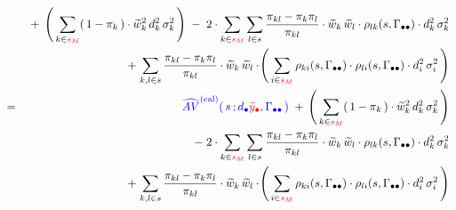 \begin{lemma}
\begin{enumerate}
\begin{eqnarray*}
    &&
        \; + \;
        \left(\,
            \underset{k\in {\color{red}s_{M}}}{\sum}\!
            \left(\,1-\pi_{k}\,\right)
            \cdot
            \widetilde{w}_{k}^{2}\,d_{k}^{2}\,\sigma_{k}^{2}
            \,\right)
        \; - \; 2 \cdot
        \underset{k \in {\color{red}s_{M}}}{\sum}\,
        \underset{l \in {\color{black}s}}{\sum}\,
        \dfrac{\pi_{kl} - \pi_{k}\pi_{l}}{\pi_{kl}}
        \cdot
        \widetilde{w}_{k}\,\widetilde{w}_{l}
        \cdot
        \rho_{lk}(s,\Gamma_{\bullet\bullet})
        \cdot
        d_{k}^{2}\,
        \sigma_{k}^{2}
    \\
    &&
        \; + \;
        \underset{k,l \in s}{\sum}\,
        \dfrac{\pi_{kl} - \pi_{k}\pi_{l}}{\pi_{kl}}
        \cdot
        \widetilde{w}_{k}\,\widetilde{w}_{l}
        \cdot\!
        \left(\,
            \underset{i \in {\color{red}s_{M}} }{\sum}\,
            \rho_{ki}(s,\Gamma_{\bullet\bullet})
            \cdot
            \rho_{li}(s,\Gamma_{\bullet\bullet})
            \cdot
            d_{i}^{2}\,\sigma_{i}^{2}
            \,\right)
    \\
    & = &
        {\color{blue}
        \widehat{AV}^{\textnormal{(cal)}}(\,s\,;d_{\bullet}{\color{red}\widetilde{y}_{\bullet}},\Gamma_{\bullet\bullet}\,)
        }
        \; + \,
        \left(\,
            \underset{k\in {\color{red}s_{M}}}{\sum}\!
            \left(\,1-\pi_{k}\,\right)
            \cdot
            \widetilde{w}_{k}^{2}\,d_{k}^{2}\,\sigma_{k}^{2}
            \,\right)
    \\
    &&
        \; - \; 2 \cdot
        \underset{k \in {\color{red}s_{M}}}{\sum}\,
        \underset{l \in {\color{black}s}}{\sum}\,
        \dfrac{\pi_{kl} - \pi_{k}\pi_{l}}{\pi_{kl}}
        \cdot
        \widetilde{w}_{k}\,\widetilde{w}_{l}
        \cdot
        \rho_{lk}(s,\Gamma_{\bullet\bullet})
        \cdot
        d_{k}^{2}\,
        \sigma_{k}^{2}
    \\
    &&
        \; + \;
        \underset{k,l \in s}{\sum}\,
        \dfrac{\pi_{kl} - \pi_{k}\pi_{l}}{\pi_{kl}}
        \cdot
        \widetilde{w}_{k}\,\widetilde{w}_{l}
        \cdot\!
        \left(\,
            \underset{i \in {\color{red}s_{M}} }{\sum}\,
            \rho_{ki}(s,\Gamma_{\bullet\bullet})
            \cdot
            \rho_{li}(s,\Gamma_{\bullet\bullet})
            \cdot
            d_{i}^{2}\,\sigma_{i}^{2}
            \,\right)
    \end{eqnarray*}
\end{enumerate}
\end{lemma}
